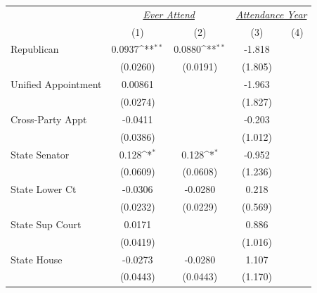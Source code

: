 {
\def\sym#1{\ifmmode^{#1}\else\(^{#1}\)\fi}
\begin{tabular}{l*{4}{c}}
\toprule
                    &\multicolumn{2}{c}{\uline{\textit{Ever Attend}}}&\multicolumn{2}{c}{\uline{\textit{Attendance Year}}}\\
                    &\multicolumn{1}{c}{(1)}        &\multicolumn{1}{c}{(2)}        &\multicolumn{1}{c}{(3)}        &\multicolumn{1}{c}{(4)}        \\
\midrule
Republican          &      0.0937\sym{**}&      0.0880\sym{**}&      -1.818        &                    \\
                    &    (0.0260)        &    (0.0191)        &     (1.805)        &                    \\
\addlinespace
Unified Appointment &     0.00861        &                    &      -1.963        &                    \\
                    &    (0.0274)        &                    &     (1.827)        &                    \\
\addlinespace
Cross-Party Appt    &     -0.0411        &                    &      -0.203        &                    \\
                    &    (0.0386)        &                    &     (1.012)        &                    \\
\addlinespace
State Senator       &       0.128\sym{*} &       0.128\sym{*} &      -0.952        &                    \\
                    &    (0.0609)        &    (0.0608)        &     (1.236)        &                    \\
\addlinespace
State Lower Ct      &     -0.0306        &     -0.0280        &       0.218        &                    \\
                    &    (0.0232)        &    (0.0229)        &     (0.569)        &                    \\
\addlinespace
State Sup Court     &      0.0171        &                    &       0.886        &                    \\
                    &    (0.0419)        &                    &     (1.016)        &                    \\
\addlinespace
State House         &     -0.0273        &     -0.0280        &       1.107        &                    \\
                    &    (0.0443)        &    (0.0443)        &     (1.170)        &                    \\

\end{tabular}}
